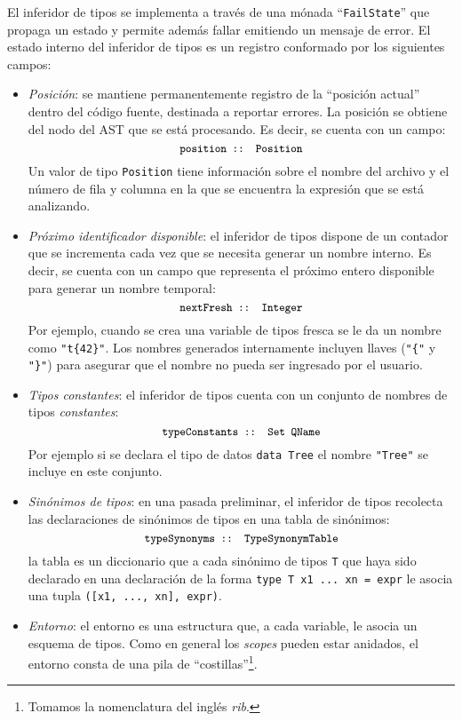El inferidor de tipos se implementa a través
de una mónada ``\verb|FailState|'' que propaga un estado
y permite además fallar emitiendo un mensaje de error.
El estado interno del inferidor de tipos es un registro
conformado por los siguientes campos:
\begin{itemize}
  \item {\em Posición}:
    se mantiene permanentemente registro de la ``posición actual'' dentro
    del código fuente, destinada a reportar errores.
    La posición se obtiene del nodo del AST que se está procesando.
    Es decir, se cuenta con un campo:
    \[ {\small \texttt{position :: Position}} \]
    Un valor de tipo \verb|Position| tiene información sobre
    el nombre del archivo y el número de fila y columna
    en la que se encuentra la expresión que se está analizando.
  \item {\em Próximo identificador disponible}:
    el inferidor de tipos dispone de un contador que se incrementa cada
    vez que se necesita generar un nombre interno.
    Es decir, se cuenta con un campo que representa el próximo entero
    disponible para generar un nombre temporal:
    \[ {\small \texttt{nextFresh :: Integer}} \]
    Por ejemplo, cuando se crea una variable de tipos fresca
    se le da un nombre como \verb|"t{42}"|. 
    Los nombres generados internamente incluyen llaves (\verb|"{"| y \verb|"}"|)
    para asegurar que el nombre no pueda ser ingresado por el usuario.
  \item {\em Tipos constantes}:
    el inferidor de tipos cuenta con un conjunto de nombres de tipos {\em constantes}:
    \[ {\small \texttt{typeConstants :: Set QName}} \]
    Por ejemplo si se declara el tipo de datos \verb|data Tree|
    el nombre \verb|"Tree"| se incluye en este conjunto.
  \item {\em Sinónimos de tipos}:
    en una pasada preliminar, el inferidor de tipos recolecta las declaraciones de
    sinónimos de tipos en una tabla de sinónimos:
    \[ {\small \texttt{typeSynonyms :: TypeSynonymTable}} \]
    la tabla es un diccionario que a cada sinónimo de tipos \verb|T|
    que haya sido declarado en una declaración
    de la forma \verb|type T x1 ... xn = expr|
    le asocia una tupla \verb|([x1, ..., xn], expr)|.
  \item {\em Entorno}:
    el entorno es una estructura que, a cada variable, le asocia un esquema de tipos. 
    Como en general los {\em scopes} pueden estar anidados,
    el entorno consta de una pila de ``costillas''\footnote{Tomamos la nomenclatura del inglés {\em rib}.}.

\end{itemize}
